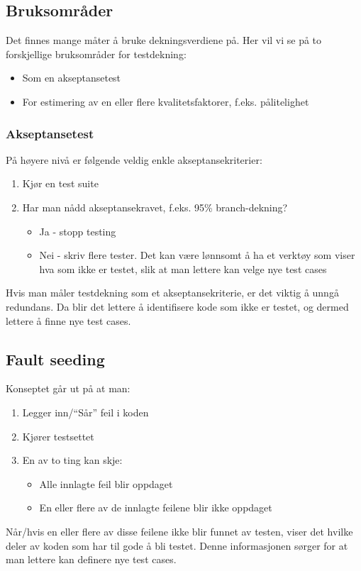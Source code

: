 \subsection{Bruksområder}

Det finnes mange måter å bruke dekningsverdiene på. Her vil vi se på to
forskjellige bruksområder for testdekning:

\begin{itemize}
\item
  Som en akseptansetest
\item
  For estimering av en eller flere kvalitetsfaktorer, f.eks.
  pålitelighet
\end{itemize}
\subsubsection{Akseptansetest}

På høyere nivå er følgende veldig enkle akseptansekriterier:

\begin{enumerate}[1.]
\item
  Kjør en test suite
\item
  Har man nådd akseptansekravet, f.eks. 95\% branch-dekning?
  \begin{itemize}
  \item
    Ja - stopp testing
  \item
    Nei - skriv flere tester. Det kan være lønnsomt å ha et verktøy som
    viser hva som ikke er testet, slik at man lettere kan velge nye test
    cases
  \end{itemize}
\end{enumerate}
Hvis man måler testdekning som et akseptansekriterie, er det viktig å
unngå redundans. Da blir det lettere å identifisere kode som ikke er
testet, og dermed lettere å finne nye test cases.

\subsection{Fault seeding}

Konseptet går ut på at man:

\begin{enumerate}[1.]
\item
  Legger inn/``Sår'' feil i koden
\item
  Kjører testsettet
\item
  En av to ting kan skje:
  \begin{itemize}
  \item
    Alle innlagte feil blir oppdaget
  \item
    En eller flere av de innlagte feilene blir ikke oppdaget
  \end{itemize}
\end{enumerate}
Når/hvis en eller flere av disse feilene ikke blir funnet av testen,
viser det hvilke deler av koden som har til gode å bli testet. Denne
informasjonen sørger for at man lettere kan definere nye test cases.


